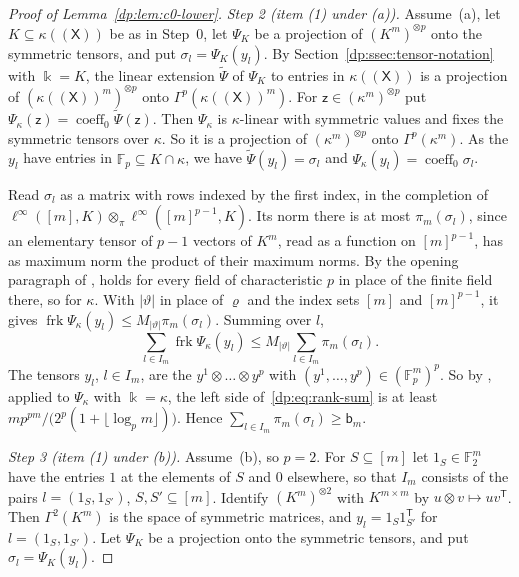 \documentclass[11pt]{amsart}
\theoremstyle{definition}
\theoremstyle{remark}
\numberwithin{equation}{section}
\newcommand{\F}{\mathbb F}
\newcommand{\linf}{\ell^\infty}
\newcommand{\abs}[1]{\lvert #1\rvert}
\newcommand{\coeff}{\operatorname{coeff}}
\theoremstyle{plain}
\theoremstyle{definition}
\theoremstyle{plain}
\begin{document}
\begin{proof}[Proof of Lemma~\ref{dp:lem:c0-lower}]
\emph{Step 2 (item (1) under (a)).} Assume~(a), let $K\subseteq\kappa((\mathsf X))$ be as in Step~0, let $\Psi_K$ be a projection of $(K^m)^{\otimes p}$ onto the symmetric tensors, and put $\sigma_l=\Psi_K(y_l)$. By Section~\ref{dp:ssec:tensor-notation} with $\Bbbk=K$, the linear extension $\widetilde\Psi$ of $\Psi_K$ to entries in $\kappa((\mathsf X))$ is a projection of $(\kappa((\mathsf X))^m)^{\otimes p}$ onto $\Gamma^p(\kappa((\mathsf X))^m)$. For $\mathsf z\in(\kappa^m)^{\otimes p}$ put $\Psi_\kappa(\mathsf z)=\coeff_0\widetilde\Psi(\mathsf z)$. Then $\Psi_\kappa$ is $\kappa$\nobreakdash-linear with symmetric values and fixes the symmetric tensors over $\kappa$. So it is a projection of $(\kappa^m)^{\otimes p}$ onto $\Gamma^p(\kappa^m)$. As the $y_l$ have entries in $\F_p\subseteq K\cap\kappa$, we have $\widetilde\Psi(y_l)=\sigma_l$ and $\Psi_\kappa(y_l)=\coeff_0\sigma_l$.

Read $\sigma_l$ as a matrix with rows indexed by the first index, in the completion of $\linf([m],K)\otimes_\pi\linf([m]^{p-1},K)$. Its norm there is at most $\pi_m(\sigma_l)$, since an elementary tensor of $p-1$ vectors of $K^m$, read as a function on $[m]^{p-1}$, has as maximum norm the product of their maximum norms. By the opening paragraph of \cite[Appendix~K]{I}, \cite[Lemma~K.2(2)]{I} holds for every field of characteristic $p$ in place of the finite field there, so for $\kappa$. With $\abs\vartheta$ in place of $\varrho$ and the index sets $[m]$ and $[m]^{p-1}$, it gives $\operatorname{frk}\Psi_\kappa(y_l)\le M_{\abs\vartheta}\pi_m(\sigma_l)$. Summing over $l$,
\begin{equation}\label{dp:eq:rank-sum}
 \sum_{l\in I_m}\operatorname{frk}\Psi_\kappa(y_l)\le M_{\abs\vartheta}\sum_{l\in I_m}\pi_m(\sigma_l).
\end{equation}
The tensors $y_l$, $l\in I_m$, are the $y^1\otimes\dots\otimes y^p$ with $(y^1,\dots,y^p)\in(\F_p^m)^p$. So by \cite[Lemma~Q.6(4)]{I}, applied to $\Psi_\kappa$ with $\Bbbk=\kappa$, the left side of~\eqref{dp:eq:rank-sum} is at least $mp^{pm}/\bigl(2^p(1+\lfloor\log_pm\rfloor)\bigr)$. Hence $\sum_{l\in I_m}\pi_m(\sigma_l)\ge\mathsf b_m$.

\emph{Step 3 (item (1) under (b)).} Assume~(b), so $p=2$. For $S\subseteq[m]$ let $1_S\in\F_2^m$ have the entries $1$ at the elements of $S$ and $0$ elsewhere, so that $I_m$ consists of the pairs $l=(1_S,1_{S'})$, $S,S'\subseteq[m]$. Identify $(K^m)^{\otimes2}$ with $K^{m\times m}$ by $u\otimes v\mapsto uv^{\mathsf T}$. Then $\Gamma^2(K^m)$ is the space of symmetric matrices, and $y_l=1_S1_{S'}^{\mathsf T}$ for $l=(1_S,1_{S'})$. Let $\Psi_K$ be a projection onto the symmetric tensors, and put $\sigma_l=\Psi_K(y_l)$.


\end{proof}
\end{document}

